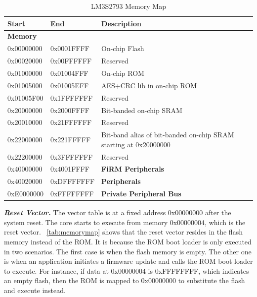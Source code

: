 \begin{center}
	\begin{table}
		\begin{tabular}{|p{1.6cm}  p{1.6cm}  p{4cm}|} 
			\hline
			Start & End & Description \\ 
			\hline
			\textbf{Memory} & & \\
			\hline
			0x00000000 & 0x0001FFFF & On-chip Flash \\ 
			\hline
			0x00020000 & 0x00FFFFFF & Reserved \\
			\hline
			0x01000000 & 0x01004FFF & On-chip ROM  \\
			\hline
			0x01005000 & 0x01005EFF & AES+CRC lib in on-chip ROM   \\
			\hline
			0x01005F00 & 0x1FFFFFFF & Reserved \\ 
			\hline
			0x20000000 & 0x2000FFFF & Bit-banded on-chip SRAM \\
			\hline
			0x20010000 & 0x21FFFFFF & Reserved \\
			\hline
			0x22000000 & 0x221FFFFF & Bit-band alias of bit-banded on-chip SRAM starting at 0x20000000 \\
			\hline
			0x22200000 & 0x3FFFFFFF & Reserved \\
			\hline
			0x40000000 & 0x4001FFFF & \textbf{FiRM Peripherals} \\  
			\hline
			0x40020000 & 0xDFFFFFFF & \textbf{Peripherals} \\
			\hline
			0xE0000000 & 0xFFFFFFFF & \textbf{Private Peripheral Bus} \\
			\hline
		\end{tabular}
		\caption{LM3S2793 Memory Map}
		\label{tab:memorymap}
	\end{table}
\end{center}


\textbf{\textit{Reset Vector.}} The vector table is at a fixed address 0x00000000 after the system reset. The core starts to execute from memory 0x00000004, which is the reset vector. ~\autoref{tab:memorymap} shows that the reset vector resides in the flash memory instead of the ROM. It is because the ROM boot loader is only executed in two scenarios. The first case is when the flash memory is empty. The other one is when an application initiates a firmware update and calls the ROM boot loader to execute. For instance, if data at 0x00000004 is 0xFFFFFFFF, which indicates an empty flash, then the ROM is mapped to 0x00000000 to substitute the flash and execute instead. 

